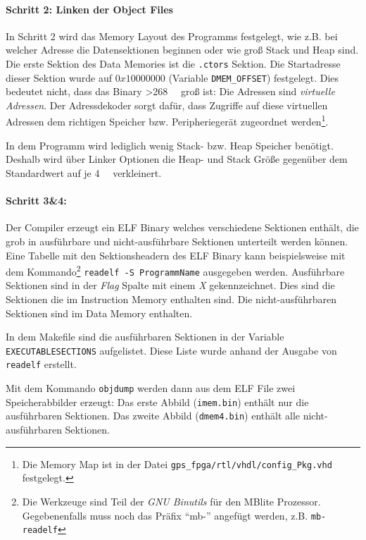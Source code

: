 \paragraph{Schritt 2: Linken der Object Files}
In Schritt 2 wird das Memory Layout des Programms festgelegt, wie z.B. bei welcher Adresse die Datensektionen beginnen oder wie groß Stack und Heap sind. Die erste Sektion des Data Memories ist die \lstinline$.ctors$ Sektion. Die Startadresse dieser Sektion wurde auf $0x10000000$ (Variable \lstinline$DMEM_OFFSET$) festgelegt. Dies bedeutet nicht, dass das Binary \SI{>268}{\mega\byte} groß ist: Die Adressen sind \emph{virtuelle Adressen}. Der Adressdekoder sorgt dafür, dass Zugriffe auf diese virtuellen Adressen dem richtigen Speicher bzw. Peripheriegerät zugeordnet werden\footnote{Die Memory Map ist in der Datei \lstinline$gps_fpga/rtl/vhdl/config_Pkg.vhd$ festgelegt.}.

In dem Programm wird lediglich wenig Stack- bzw. Heap Speicher benötigt. Deshalb wird über Linker Optionen die Heap- und Stack Größe gegenüber dem Standardwert auf je \SI{4}{\kilo\byte} verkleinert. 

\paragraph{Schritt 3\&4:}
Der Compiler erzeugt ein \gls{ELF} Binary welches verschiedene Sektionen enthält, die grob in ausführbare und nicht-ausführbare Sektionen unterteilt werden können. Eine Tabelle mit den Sektionsheadern des \gls{ELF} Binary kann beispielsweise mit dem Kommando\footnote{\label{MBBinutils}Die Werkzeuge sind Teil der \emph{GNU Binutils} für den MBlite Prozessor. Gegebenenfalls muss noch das Präfix \enquote{mb-} angefügt werden, z.B. \lstinline$mb-readelf$} \lstinline$readelf -S ProgrammName$ ausgegeben werden. Ausführbare Sektionen sind in der \emph{Flag} Spalte mit einem \emph{X} gekennzeichnet. Dies sind die Sektionen die im Instruction Memory enthalten sind. Die nicht-ausführbaren Sektionen sind im Data Memory enthalten.

In dem Makefile sind die ausführbaren Sektionen in der Variable \lstinline$EXECUTABLESECTIONS$ aufgelistet. Diese Liste wurde anhand der Ausgabe von \lstinline$readelf$ erstellt.

Mit dem Kommando \lstinline$objdump$ werden dann aus dem \gls{ELF} File zwei Speicherabbilder erzeugt: Das erste Abbild (\lstinline$imem.bin$) enthält nur die ausführbaren Sektionen. Das zweite Abbild (\lstinline$dmem4.bin$) enthält alle nicht-ausführbaren Sektionen.

